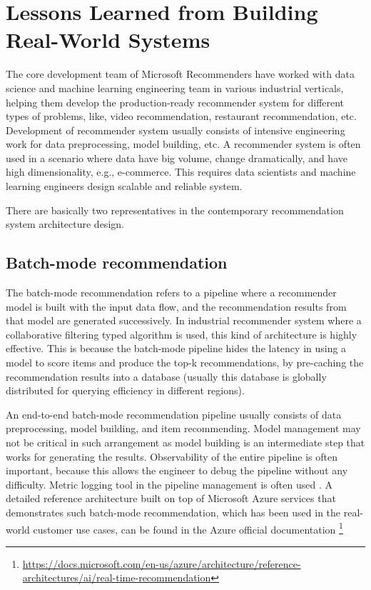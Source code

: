 \section{Lessons Learned from Building Real-World Systems} 

The core development team of Microsoft Recommenders have worked with data science and machine learning engineering team in various industrial verticals, helping them develop the production-ready recommender system for different types of problems, like, video recommendation, restaurant recommendation, etc. Development of recommender system usually consists of intensive engineering work for data preprocessing, model building, etc. A recommender system is often used in a scenario where data have big volume, change dramatically, and have high dimensionality, e.g., e-commerce. This requires data scientists and machine learning engineers design scalable and reliable system. 

There are basically two representatives in the contemporary recommendation system architecture design.

\subsection{Batch-mode recommendation}
The batch-mode recommendation refers to a pipeline where a recommender model is built with the input data flow, and the recommendation results from that model are generated successively. In industrial recommender system where a collaborative filtering typed algorithm is used, this kind of architecture is highly effective. This is because the batch-mode pipeline hides the latency in using a model to score items and produce the top-k recommendations, by pre-caching the recommendation results into a database (usually this database is globally distributed for querying efficiency in different regions). 

An end-to-end batch-mode recommendation pipeline usually consists of data preprocessing, model building, and item recommending. Model management may not be critical in such arrangement as model building is an intermediate step that works for generating the results. Observability of the entire pipeline is often important, because this allows the engineer to debug the pipeline without any difficulty. Metric logging tool in the pipeline management is often used \cite{zaharia2018accelerating}. A detailed reference architecture built on top of Microsoft Azure services that demonstrates such batch-mode recommendation, which has been used in the real-world customer use cases, can be found in the Azure official documentation \footnote{\url{https://docs.microsoft.com/en-us/azure/architecture/reference-architectures/ai/real-time-recommendation}}

